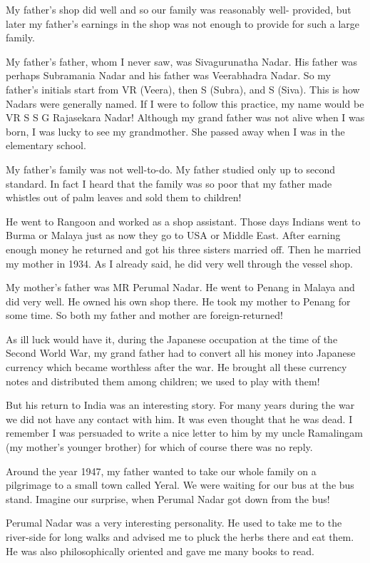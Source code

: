 My father's shop did well and so our family was reasonably well- 
provided, but later my father's earnings in the shop was not enough to 
provide for such a large family.

My father's father, whom I never saw, was Sivagurunatha Nadar. His 
father was perhaps Subramania Nadar and his father was Veerabhadra 
Nadar. So my father's initials start from VR (Veera), then S (Subra), 
and S (Siva). This is how Nadars were generally named. If I were to 
follow this practice, my name would be VR S S G Rajasekara Nadar! 
Although my grand father was not alive when I was born, I was lucky to 
see my grandmother. She passed away when I was in the elementary school.

My father's family was not well-to-do. My father studied only up to 
second standard. In fact I heard that the family was so poor that my 
father made whistles out of palm leaves and sold them to children!

He went to Rangoon and worked as a shop assistant. Those days Indians 
went to Burma or Malaya just as now they go to USA or Middle East. After 
earning enough money he returned and got his three sisters married off. 
Then he married my mother in 1934. As I already said, he did very well 
through the vessel shop.

My mother's father was MR Perumal Nadar. He went to Penang in Malaya and 
did very well. He owned his own shop there. He took my mother to Penang 
for some time. So both my father and mother are foreign-returned!

As ill luck would have it, during the Japanese occupation at the time of 
the Second World War, my grand father had to convert all his money into 
Japanese currency which became worthless after the war. He brought all 
these currency notes and distributed them among children; we used to 
play with them!

But his return to India was an interesting story. For many years during 
the war we did not have any contact with him. It was even thought that 
he was dead. I remember I was persuaded to write a nice letter to him by 
my uncle Ramalingam (my mother's younger brother) for which of course 
there was no reply.

Around the year 1947, my father wanted to take our whole family on a 
pilgrimage to a small town called Yeral. We were waiting for our bus at 
the bus stand. Imagine our surprise, when Perumal Nadar got down from 
the bus!

Perumal Nadar was a very interesting personality. He used to take me to 
the river-side for long walks and advised me to pluck the herbs there 
and eat them. He was also philosophically oriented and gave me many 
books to read.

